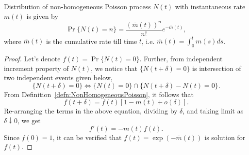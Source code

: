 \documentclass[a4paper,10pt,english]{article}
\begin{document}
\begin{prop} Distribution of non-homogeneous Poisson process $N(t)$ with instantaneous rate $m(t)$ is given by
 \begin{equation*}
 \Pr\{N(t)=n\}=\frac{(\bar{m}(t))^n}{n!}e^{-\bar{m}(t)},
 \end{equation*}
where $\bar{m}(t)$ is the cumulative rate till time $t$, i.e. $\bar{m}(t)=\int_{0}^{t}m(s)ds$. 
\end{prop}
\begin{proof}
Let's denote $f(t) = \Pr\{N(t)=0\}$. Further, from independent increment property of $N(t)$, we notice that $\{N(t+\delta) = 0\}$ is intersection of two independent events given below, 
\begin{equation*}
\{N(t+\delta)=0\} \iff \{N(t)=0\}\cap\{N(t+\delta)-N(t)=0\}.
\end{equation*}
From Definition~\ref{defn:NonHomogeneousPoisson}, it follows that
\begin{equation*}
 f(t+\delta) = f(t)[1 - m(t) + o(\delta)].
\end{equation*}
Re-arranging the terms in the above equation, dividing by $\delta$, and taking limit as $\delta \downarrow 0$, we get 
\begin{equation*}
f'(t) = -m(t)f(t).
\end{equation*}
Since $f(0) = 1$, it can be verified that $f(t) = \exp(-\bar{m}(t))$ is solution for $f(t)$.


\end{proof}
\end{document}
